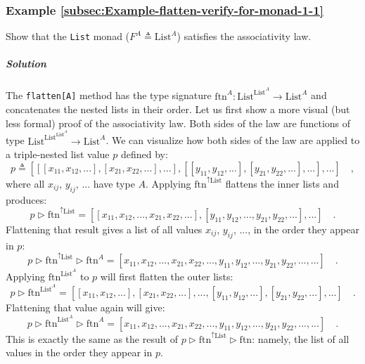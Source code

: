 \subsubsection{Example \label{subsec:Example-flatten-verify-for-monad-1-1}\ref{subsec:Example-flatten-verify-for-monad-1-1}}

Show that the \lstinline!List! monad
($F^{A}\triangleq\text{List}^{A}$) satisfies the associativity law.

\subparagraph{Solution}

The \lstinline!flatten[A]! method has the type signature $\text{ftn}^{A}:\text{List}^{\text{List}^{A}}\rightarrow\text{List}^{A}$
and concatenates the nested lists in their order. Let us first show
a more visual (but less formal) proof of the associativity law. Both
sides of the law are functions of type $\text{List}^{\text{List}^{\text{List}^{A}}}\rightarrow\text{List}^{A}$.
We can visualize how both sides of the law are applied to a triple-nested
list value $p$ defined by:
\[
p\triangleq\left[\left[\left[x_{11},x_{12},...\right],\left[x_{21},x_{22},...\right],...\right],\left[\left[y_{11},y_{12},...\right],\left[y_{21},y_{22},...\right],...\right],...\right]\quad,
\]
where all $x_{ij}$, $y_{ij}$, $...$ have type $A$. Applying $\text{ftn}^{\uparrow\text{List}}$
flattens the inner lists and produces:
\[
p\triangleright\text{ftn}^{\uparrow\text{List}}=\left[\left[x_{11},x_{12},...,x_{21},x_{22},...\right],\left[y_{11},y_{12},...,y_{21},y_{22},...\right],...\right]\quad.
\]
Flattening that result gives a list of all values $x_{ij}$, $y_{ij}$,
..., in the order they appear in $p$:
\[
p\triangleright\text{ftn}^{\uparrow\text{List}}\triangleright\text{ftn}^{A}=\left[x_{11},x_{12},...,x_{21},x_{22},...,y_{11},y_{12},...,y_{21},y_{22},...,...\right]\quad.
\]
Applying $\text{ftn}^{\text{List}^{A}}$ to $p$ will first flatten
the outer lists:
\[
p\triangleright\text{ftn}^{\text{List}^{A}}=\left[\left[x_{11},x_{12},...\right],\left[x_{21},x_{22},...\right],...,\left[y_{11},y_{12},...\right],\left[y_{21},y_{22},...\right],...\right]\quad.
\]
Flattening that value again will give: 
\[
p\triangleright\text{ftn}^{\text{List}^{A}}\triangleright\text{ftn}^{A}=\left[x_{11},x_{12},...,x_{21},x_{22},...,y_{11},y_{12},...,y_{21},y_{22},...,...\right]\quad.
\]
This is exactly the same as the result of $p\triangleright\text{ftn}^{\uparrow\text{List}}\triangleright\text{ftn}$:
namely, the list of all values in the order they appear in $p$.

